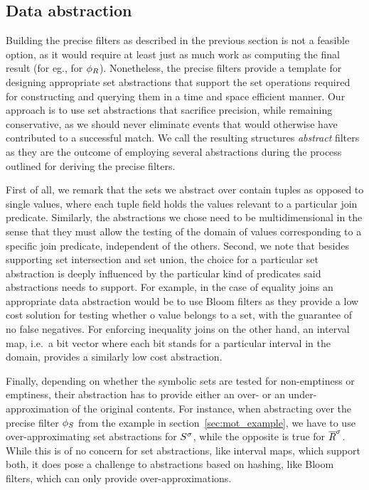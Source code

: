 \subsection{Data abstraction}
\label{sec:data_abstraction}


Building the precise filters as described in the previous section is not a 
feasible option, as it would require at least just as much work as computing 
the final result (for eg., for $\phi_{R}$).
Nonetheless, the precise filters provide a template for designing 
appropriate set abstractions that support the set operations required for 
constructing and querying them in a time and space efficient manner. 
Our approach is to use set abstractions that sacrifice precision, while 
remaining conservative, as we should never eliminate events that would 
otherwise have contributed to a successful match.
We call the resulting structures {\em abstract} filters as they are the outcome 
of employing several abstractions during the process outlined for deriving the 
precise filters.  


First of all, we remark that the sets we abstract over contain tuples as 
opposed to single values, where each tuple field holds the values relevant to a 
particular join predicate. 
Similarly, the abstractions we chose need to be multidimensional in the sense 
that they must allow the testing of the domain of values corresponding to a 
specific join predicate, independent of the others.  
Second, we note that besides supporting set intersection and set union, the 
choice for a particular set abstraction is deeply influenced by the particular 
kind of predicates said abstractions needs to support.
For example, in the case of equality joins an appropriate data abstraction 
would be to use Bloom filters as they provide a low cost solution for testing 
whether o value belongs to a set, with the guarantee of no false negatives.
For enforcing inequality joins on the other hand, an interval map, i.e.\ a 
bit vector where each bit stands for a particular interval in the domain,
provides a similarly low cost abstraction.  

Finally, depending on whether the symbolic sets are tested for non-emptiness or 
emptiness, their abstraction has to provide either an over- or an 
under-approximation of the original contents.
For instance, when abstracting over the precise filter $\phi_{S}$ from the 
example in section~\ref{sec:mot_example}, we have to use over-approximating set 
abstractions for ${S}^{\sigma}$, while the opposite is true for ${\overline{R}}^{\sigma}$.
While this is of no concern for set abstractions, like interval maps, which 
support both, it does pose a challenge to abstractions based on hashing, like 
Bloom filters, which can only provide over-approximations.


